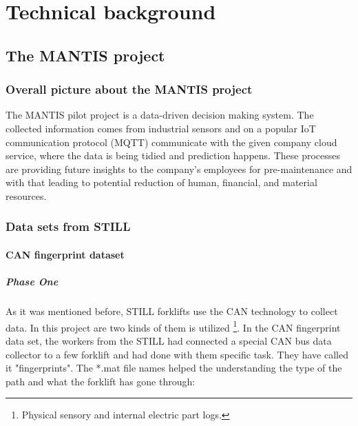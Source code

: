 \chapter{Technical background}
	\section{The MANTIS project}
		\subsection{Overall picture about the MANTIS project}
The MANTIS pilot project is a data-driven decision making system. The collected information comes from industrial sensors and on a popular IoT communication protocol (MQTT) communicate with the given company cloud service, where the data is being tidied and prediction happens. These processes are providing future insights to the company's employees for pre-maintenance and with that leading to potential reduction of human, financial, and material resources.\cite{Mantis}

		\subsection{Data sets from STILL}
			\subsubsection{CAN fingerprint dataset}
				\paragraph{Phase One}
				\noindent
As it was mentioned before, STILL forklifts \cite{RX20} use the CAN technology to collect data. In this project are two kinds of them is utilized \footnote{Physical sensory and internal electric part logs.}. In the CAN fingerprint data set, the workers from the STILL had connected a special CAN bus data collector to a few forklift and had done with them specific task. They have called it "fingerprints". The *.mat file names helped the understanding the type of the path and what the forklift has gone through:

